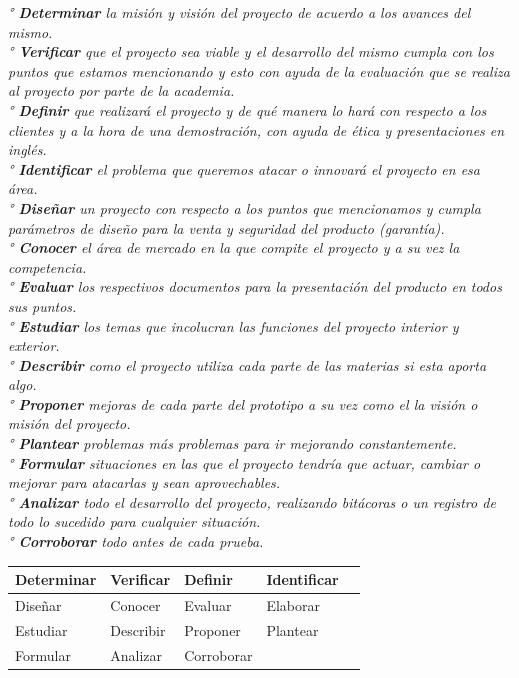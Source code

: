 \documentclass[11pt,a4paper]{article}
\begin{document}
\newpage
\textit{° \textbf{Determinar} la misión y visión del proyecto de acuerdo a los avances del mismo.\\
° \textbf{Verificar} que el proyecto sea viable y el desarrollo del mismo cumpla con los puntos que estamos mencionando y esto con ayuda de la evaluación que se realiza al proyecto por parte de la academia.\\
° \textbf{Definir} que realizará el proyecto y de qué manera lo hará con respecto a los clientes y a la hora de una demostración, con ayuda de ética y presentaciones en inglés.\\
° \textbf{Identificar} el problema que queremos atacar o innovará el proyecto en esa área.\\
° \textbf{Diseñar} un proyecto con respecto a los puntos que mencionamos y cumpla parámetros de diseño para la venta y seguridad del producto (garantía).\\
° \textbf{Conocer} el área de mercado en la que compite el proyecto y a su vez la competencia.\\
° \textbf{Evaluar} los respectivos documentos para la presentación del producto en todos sus puntos.\\
° \textbf{Estudiar} los temas que incolucran las funciones del proyecto interior y exterior.\\
° \textbf{Describir} como el proyecto utiliza cada parte de las materias si esta aporta algo.\\
° \textbf{Proponer} mejoras de cada parte del prototipo a su vez como el la visión o misión del proyecto.\\
° \textbf{Plantear} problemas más problemas para ir mejorando constantemente.\\
° \textbf{Formular} situaciones en las que el proyecto tendría que actuar, cambiar o mejorar para atacarlas y sean aprovechables.\\
° \textbf{Analizar} todo el desarrollo del proyecto, realizando bitácoras o un registro de todo lo sucedido para cualquier situación.\\
° \textbf{Corroborar} todo antes de cada prueba.\\ }



\begin{table}
\centering
\begin{tabular}{lllll}
Determinar & Verificar & Definir & Identificar \\ \hline 
Diseñar & Conocer & Evaluar & Elaborar \\ \hline
Estudiar & Describir & Proponer & Plantear \\ \hline
Formular & Analizar & Corroborar &  \\ \hline
\end{tabular}
\end{table}
\end{document}
